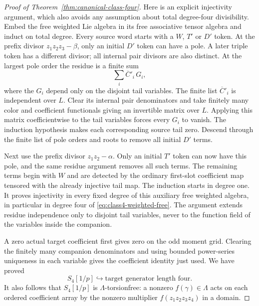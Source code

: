 \begin{proof}[Proof of Theorem~\ref{thm:canonical-class-four}]
Here is an explicit injectivity argument, which also
avoids any assumption about total degree-four
divisibility. Embed the free weighted Lie algebra
in its free associative tensor algebra and induct on
total degree. Every source word starts with a $W$,
$T'$ or $D'$ token. At the prefix divisor
$z_1z_2z_3-\beta$, only an initial $D'$ token can have
a pole. A later triple token has a different divisor;
all internal pair divisors are also distinct. At the
largest pole order the residue is a finite sum
\[
                   \sum_i\overline C'_i\,G_i,
\]
where the $G_i$ depend only on the disjoint tail
variables. The finite list $\overline C'_i$ is
independent over $L$. Clear its internal pair
denominators and take finitely many color and
coefficient functionals giving an invertible matrix
over $L$. Applying this matrix coefficientwise to the
tail variables forces every $G_i$ to vanish. The
induction hypothesis makes each corresponding source
tail zero. Descend through the finite list of pole
orders and roots to remove all initial $D'$ terms.

Next use the prefix divisor $z_1z_2-\alpha$. Only an
initial $T'$ token can now have this pole, and the same
residue argument removes all such terms. The remaining
terms begin with $W$ and are detected by the ordinary
first-slot coefficient map tensored with the already
injective tail map. The induction starts in degree
one. It proves injectivity in every fixed degree of
this auxiliary free weighted algebra, in particular
in degree four of \eqref{eq:class4-weighted-free}.
The argument extends residue independence only to
disjoint tail variables, never to the function field
of the variables inside the companion.

A zero actual target coefficient first gives zero on
the odd moment grid. Clearing the finitely many
companion denominators and using bounded power-series
uniqueness in each variable gives the coefficient
identity just used. We have proved
\begin{equation}\label{eq:class4-rational-injection}
 S_4[1/p]\hookrightarrow
                     \text{target generator length four}.
\end{equation}
It also follows that $S_4[1/p]$ is $\Lambda$-torsionfree:
a nonzero $f(\gamma)\in\Lambda$ acts on each ordered
coefficient array by the nonzero multiplier
$f(z_1z_2z_3z_4)$ in a domain.


\end{proof}
